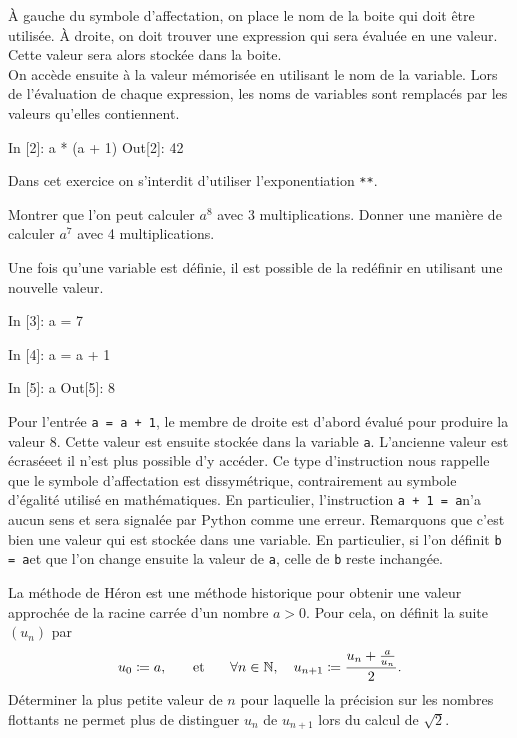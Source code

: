 \documentclass{magnoliaold}
\begin{document}
\noindent À gauche du symbole d'affectation, on place le nom de la boite qui doit
être utilisée. À droite, on doit trouver une expression qui sera évaluée en une valeur. Cette
valeur sera alors stockée dans la boite.\\

On accède ensuite à la valeur mémorisée en utilisant le nom de la variable. Lors de
l'évaluation de chaque expression, les noms de variables sont remplacés par les valeurs
qu'elles contiennent.

\begin{pythoncode}
In [2]: a * (a + 1)
Out[2]: 42 
\end{pythoncode}



\begin{exoUnique}
\exo Dans cet exercice on s'interdit d'utiliser l'exponentiation \og\verb_**_\fg.
\begin{questions}
\question Montrer que l'on peut calculer $a^8$ avec 3 multiplications.
\question Donner une manière de calculer $a^7$ avec 4 multiplications.
\end{questions}
\end{exoUnique}
\bigskip

Une fois qu'une variable est définie, il est possible de la redéfinir en utilisant une nouvelle valeur.

\begin{pythoncode}
In [3]: a = 7

In [4]: a = a + 1

In [5]: a
Out[5]: 8
\end{pythoncode}

\noindent Pour l'entrée \verb!a = a + 1!, le membre de droite est d'abord évalué pour produire la valeur 8.
Cette valeur est ensuite stockée dans la variable \verb_a_. L'ancienne valeur est \og
écrasée\fg et il n'est plus possible d'y accéder. Ce type d'instruction nous rappelle que le
symbole d'affectation est dissymétrique, contrairement au symbole d'égalité utilisé en
mathématiques. En particulier, l'instruction \og\verb_a + 1 = a_\fg n'a aucun sens et sera
signalée par Python comme une erreur. Remarquons que c'est bien une valeur qui est
stockée dans une variable. En particulier, si l'on définit
\og\verb_b = a_\fg et que l'on change ensuite la valeur de \verb_a_, celle de
\verb_b_ reste inchangée.
\vspace{2ex}
\begin{exoUnique}
\exo La méthode de Héron est une méthode historique pour obtenir une valeur
  approchée de la racine carrée d'un nombre $a>0$. Pour cela, on définit
	la suite $(u_n)$ par
	\[u_0\coloneqq a, \quad\quad\!\text{et}\quad\!\quad \forall n\in\mathbb{N},\quad u_{n+1}\coloneqq\frac{u_n + \frac{a}{u_n}}{2}.\]
	Déterminer la plus petite valeur de $n$ pour laquelle la précision sur les nombres
	flottants ne permet plus de distinguer $u_n$ de $u_{n+1}$ lors du calcul de $\sqrt{2}$.
\end{exoUnique}
\vspace{2ex}
\end{document}
